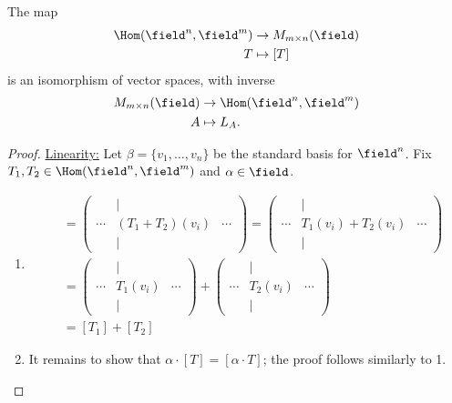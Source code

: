 \begin{proposition}\label{prop:isomorphismbetweenhomandmat}
    The map \begin{align*}
        \Hom(\field^n, \field^m) &\to M_{m \times n}(\field)\\
         T &\mapsto [T]
    \end{align*}
    is an isomorphism of vector spaces, with inverse \begin{align*}
        M_{m \times n}(\field) &\to \Hom(\field^n, \field^m)\\
        A &\mapsto L_A.
    \end{align*}
\end{proposition}

\begin{proof}
    \underline{Linearity:} Let $\beta = \{v_1, \dots, v_n\}$ be the standard basis for $\field^n$. Fix $T_1, T_2 \in \Hom(\field^n, \field^m)$ and $\alpha \in \field$. 
    \begin{enumerate}
        \item \begin{align*}
            [T_1 + T_2] &= \begin{pmatrix}
         & \vert & \\
            \cdots & (T_1+T_2)(v_i) & \cdots\\
            & \vert & 
        \end{pmatrix} = \begin{pmatrix}
            & \vert & \\
               \cdots & T_1(v_i)+T_2(v_i) & \cdots\\
                & \vert & 
           \end{pmatrix}\\ 
           &= \begin{pmatrix}
            & \vert &\\
            \cdots & T_1(v_i) & \cdots\\
            & \vert & 
           \end{pmatrix} + \begin{pmatrix}
            & \vert &\\
            \cdots & T_2(v_i) & \cdots\\
            & \vert & 
           \end{pmatrix} \\
           &= [T_1] + [T_2]
        \end{align*}
        \item It remains to show that $\alpha \cdot [T] = [\alpha \cdot T]$; the proof follows similarly to 1.

\end{enumerate}
\end{proof}
